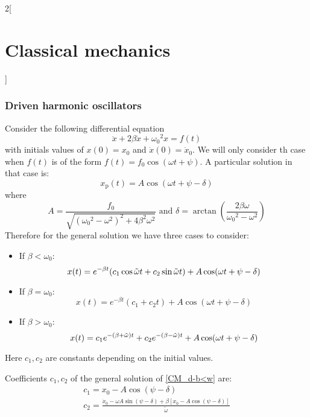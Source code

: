 \documentclass[../../../main.tex]{subfiles}
\begin{document}
\begin{multicols}{2}[\section{Classical mechanics}]
  \subsubsection{Driven harmonic oscillators}
  \begin{proposition}
    Consider the following differential equation $$\ddot{x}+2\beta\dot{x}+{\omega_0}^2 x=f(t)$$ with initials values of $x(0)=x_0$ and $\dot{x}(0)=\dot{x}_0$. We will only consider th case when $f(t)$ is of the form $f(t)=f_0\cos(\omega t+\psi)$. A particular solution in that case is:
    $$x_\text{p}(t)=A\cos(\omega t+\psi-\delta)$$
    where $$A=\frac{f_0}{\sqrt{{({\omega_0}^2-\omega^2)}^2+4\beta^2\omega^2}}\text{ and }\delta=\arctan\left({\frac{2\beta\omega}{{\omega_0}^2-\omega^2}}\right)$$ Therefore for the general solution we have three cases to consider:
    \begin{itemize}
      \item If $\beta<\omega_0$:
            \begin{equation}
              x(t)=e^{-\beta t}(c_1\cos\Tilde{\omega}t+c_2\sin\Tilde{\omega}t)+A\cos(\omega t+\psi-\delta)
              \label{CM_d-b<w}
            \end{equation}
      \item If $\beta=\omega_0$:
            \begin{equation}
              x(t)=e^{-\beta t}\left(c_1+c_2t\right)+A\cos(\omega t+\psi-\delta)
              \label{CM_d-b=w}
            \end{equation}
      \item If $\beta>\omega_0$:
            \begin{equation}
              x(t)=c_1e^{-(\beta+\Tilde{\omega})t}+c_2e^{-(\beta-\Tilde{\omega})t}+A\cos(\omega t+\psi-\delta)
              \label{CM_d-b>w}
            \end{equation}
    \end{itemize}
    Here $c_1,c_2$ are constants depending on the initial values.
  \end{proposition}
  \begin{proposition}
    Coefficients $c_1,c_2$ of the general solution of \cref{CM_d-b<w} are:
    \begin{gather*}
      c_1=x_0-A\cos\left(\psi-\delta\right)\\
      c_2=\frac{\dot{x}_0-\omega A\sin\left(\psi-\delta\right)+\beta\left[x_0-A\cos\left(\psi-\delta\right)\right]}{\tilde{\omega}}
    \end{gather*}

\end{proposition}
\end{multicols}
\end{document}

